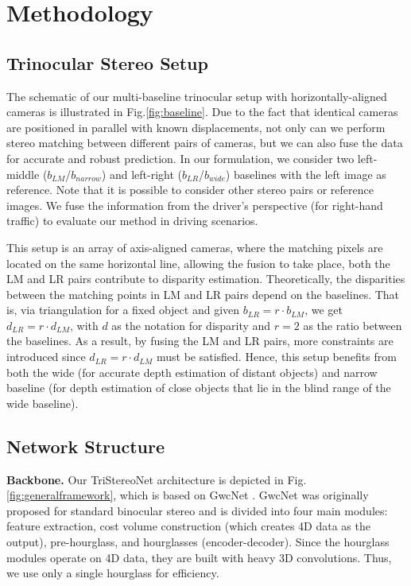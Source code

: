 \documentclass[10pt,twocolumn,letterpaper]{article}
\begin{document}
\section{Methodology}
\label{ProposedMethod}
\subsection{Trinocular Stereo Setup}
The schematic of our multi-baseline trinocular setup with horizontally-aligned cameras is illustrated in Fig.\ref{fig:baseline}. Due to the fact that identical cameras are positioned in parallel with known displacements, not only can we perform stereo matching between different pairs of cameras, but we can also fuse the data for accurate and robust prediction. In our formulation, we consider two left-middle ($b_{LM}$/$b_{narrow}$) and left-right ($b_{LR}$/$b_{wide}$) baselines with the left image as reference. Note that it is possible to consider other stereo pairs or reference images. We fuse the information from the driver's perspective (for right-hand traffic) to evaluate our method in driving scenarios.

This setup is an array of axis-aligned cameras, where the matching pixels are located on the same horizontal line, allowing the fusion to take place, \ie both the LM and LR pairs contribute to disparity estimation. Theoretically, the disparities between the matching points in LM and LR pairs depend on the baselines. That is, via triangulation for a fixed object and given $b_{LR}=r\cdot b_{LM}$, we get $d_{LR}=r\cdot d_{LM}$, with $d$ as the notation for disparity and $r=2$ as the ratio between the baselines. As a result, by fusing the LM and LR pairs, more constraints are introduced since $d_{LR}=r\cdot d_{LM}$ must be satisfied. Hence, this setup benefits from both the wide (for accurate depth estimation of distant objects) and narrow baseline (for depth estimation of close objects that lie in the blind range of the wide baseline).
\subsection{Network Structure} 
\noindent\textbf{Backbone.} Our TriStereoNet architecture is depicted in Fig. \ref{fig:generalframework}, which is based on GwcNet \cite{guo2019group}. GwcNet was originally proposed for standard binocular stereo and is divided into four main modules: feature extraction, cost volume construction (which creates 4D data as the output), pre-hourglass, and hourglasses (encoder-decoder). Since the hourglass modules operate on 4D data, they are built with heavy 3D convolutions. Thus, we use only a single hourglass for efficiency.
\end{document}
